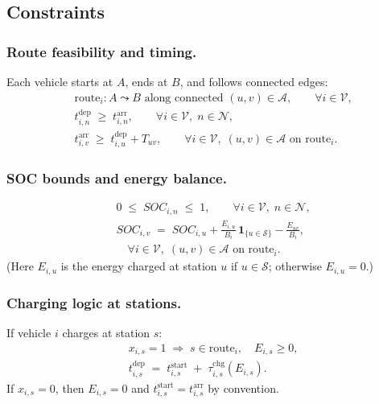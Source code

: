 \subsection{Constraints}

\subsubsection{Route feasibility and timing.}
Each vehicle starts at $A$, ends at $B$, and follows connected edges:
\begin{align*}
&\text{route}_i: A \leadsto B \text{ along connected } (u,v)\in\mathcal{A}, \qquad \forall i\in\mathcal{V},\\
&t^{\text{dep}}_{i,n}\;\ge\; t^{\text{arr}}_{i,n}, \qquad \forall i\in\mathcal{V},\; n\in\mathcal{N},\\
&t^{\text{arr}}_{i,v}\;\ge\; t^{\text{dep}}_{i,u} + T_{uv}, \qquad \forall i\in\mathcal{V},\; (u,v)\in\mathcal{A} \text{ on route}_i.
\end{align*}

\subsubsection{SOC bounds and energy balance.}
\begin{align*}
&0 \;\le\; SOC_{i,n} \;\le\; 1, \qquad \forall i\in\mathcal{V},\; n\in\mathcal{N},\\
&SOC_{i,v} \;=\; SOC_{i,u} + \frac{E_{i,u}}{B_i}\,\mathbf{1}_{\{u\in\mathcal{S}\}} - \frac{E_{uv}}{B_i},\\
&\quad \forall i\in\mathcal{V},\; (u,v)\in\mathcal{A}\text{ on route}_i.
\end{align*}
(Here $E_{i,u}$ is the energy charged at station $u$ if $u\in\mathcal{S}$; otherwise $E_{i,u}=0$.)

\subsubsection{Charging logic at stations.}
If vehicle $i$ charges at station $s$:
\begin{align*}
&x_{i,s}=1 \;\Rightarrow\; s\in\text{route}_i,\quad E_{i,s}\ge 0, \\
&t^{\text{dep}}_{i,s} \;=\; t^{\text{start}}_{i,s} \;+\; \tau^{\text{chg}}_{i,s}(E_{i,s}).
\end{align*}
If $x_{i,s}=0$, then $E_{i,s}=0$ and $t^{\text{start}}_{i,s}=t^{\text{arr}}_{i,s}$ by convention.

